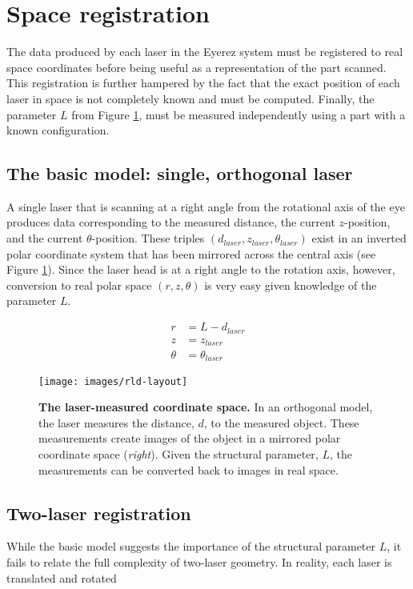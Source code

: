 
\section{Space registration}
\label{sec:space-registration}

The data produced by each laser in the Eyerez system must be
registered to real space coordinates before being useful as a
representation of the part scanned. This registration is further
hampered by the fact that the exact position of each laser in space is
not completely known and must be computed. Finally, the parameter $L$
from Figure \ref{fig:ideal-laser-geometry}, must be measured
independently using a part with a known configuration.

\subsection{The basic model: single, orthogonal laser}
\label{sec:basic-model:orthogonal}

A single laser that is scanning at a right angle from the rotational
axis of the eye produces data corresponding to the measured distance,
the current $z$-position, and the current $\theta$-position. These
triples $(d_{laser}, z_{laser}, \theta_{laser})$ exist in an inverted
polar coordinate system that has been mirrored across the central axis
(see Figure \ref{fig:ideal-laser-geometry}). Since the laser head is
at a right angle to the rotation axis, however, conversion to real
polar space $(r, z, \theta)$ is very easy given knowledge of the
parameter $L$.

\begin{align}
  r &= L - d_{laser} \\
  z &= z_{laser} \\
  \theta &= \theta_{laser}
\end{align}

\begin{figure}
  \texttt{[image: images/rld-layout]}
  \caption{\textbf{The laser-measured coordinate space.} In an
    orthogonal model, the laser measures the distance, $d$, to the
    measured object. These measurements create images of the object in
    a mirrored polar coordinate space (\textit{right}). Given the
    structural parameter, $L$, the measurements can be converted back
    to images in real space.}
  \label{fig:ideal-laser-geometry}
\end{figure}

\subsection{Two-laser registration}
\label{sec:two-laser-registr}

While the basic model suggests the importance of the structural
parameter $L$, it fails to relate the full complexity of two-laser
geometry. In reality, each laser is translated and rotated



